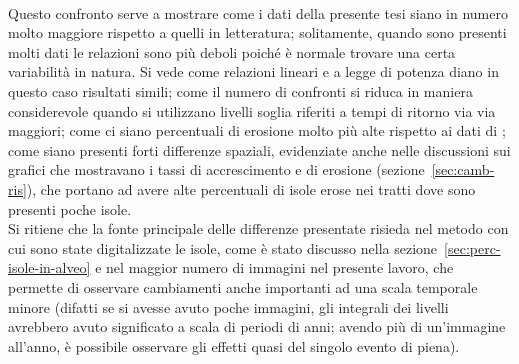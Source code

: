 %
\\
Questo confronto serve a mostrare come i dati della presente tesi siano in numero molto maggiore rispetto a quelli in letteratura; solitamente, quando sono presenti molti dati le relazioni sono più deboli poiché è normale trovare una certa variabilità in natura.
Si vede come relazioni lineari e a legge di potenza diano in questo caso risultati simili;
come il numero di confronti si riduca in maniera considerevole quando si utilizzano livelli soglia riferiti a tempi di ritorno via via maggiori;
come ci siano percentuali di erosione molto più alte rispetto ai dati di ;
come siano presenti forti differenze spaziali, evidenziate anche nelle discussioni sui grafici che mostravano i tassi di accrescimento e di erosione (sezione~\ref{sec:camb-ris}), che portano ad avere alte percentuali di isole erose nei tratti dove sono presenti poche isole.
\\
Si ritiene che la fonte principale delle differenze presentate risieda nel metodo con cui sono state digitalizzate le isole, come è stato discusso nella sezione~\ref{sec:perc-isole-in-alveo} e nel maggior numero di immagini nel presente lavoro, che permette di osservare cambiamenti anche importanti ad una scala temporale minore (difatti se si avesse avuto poche immagini, gli integrali dei livelli avrebbero avuto significato a scala di periodi di anni; avendo più di un'immagine all'anno, è possibile osservare gli effetti quasi del singolo evento di piena).




